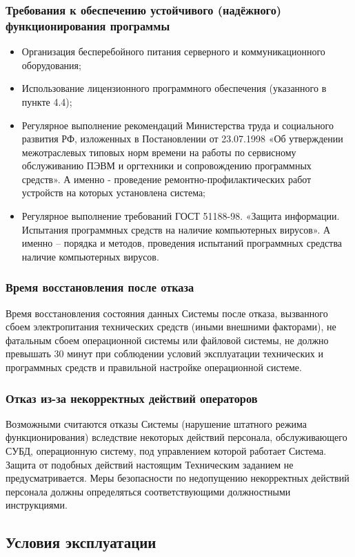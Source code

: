     \subsubsection{Требования к обеспечению устойчивого (надёжного) функционирования программы}
      \begin{itemize}
        \item Организация бесперебойного питания серверного и коммуникационного оборудования;
        \item Использование лицензионного программного обеспечения (указанного в пункте 4.4);
        \item Регулярное выполнение рекомендаций Министерства труда и социального развития РФ, изложенных в Постановлении от 23.07.1998 «Об утверждении межотраслевых типовых норм времени на работы по сервисному обслуживанию ПЭВМ и оргтехники и сопровождению программных средств». А именно -  проведение ремонтно-профилактических работ устройств на которых установлена система;
        \item Регулярное выполнение требований ГОСТ 51188-98. «Защита информации. Испытания программных средств на наличие компьютерных вирусов». А именно – порядка и методов, проведения испытаний программных средства наличие компьютерных вирусов. 
    \end{itemize}
    \subsubsection{Время восстановления после отказа}
      Время восстановления состояния данных Системы после отказа, вызванного сбоем электропитания технических средств (иными внешними факторами), не фатальным сбоем операционной системы или файловой системы, не должно превышать 30 минут при соблюдении условий эксплуатации технических и программных средств и правильной настройке операционной системе.
    \subsubsection{Отказ из-за некорректных действий операторов}
      Возможными считаются отказы Системы (нарушение штатного режима функционирования) вследствие некоторых действий персонала, обслуживающего СУБД, операционную систему, под управлением которой работает Система. Защита от подобных действий настоящим Техническим заданием не предусматривается. Меры безопасности по недопущению некорректных действий персонала должны определяться соответствующими должностными инструкциями.
  \subsection{Условия эксплуатации}
